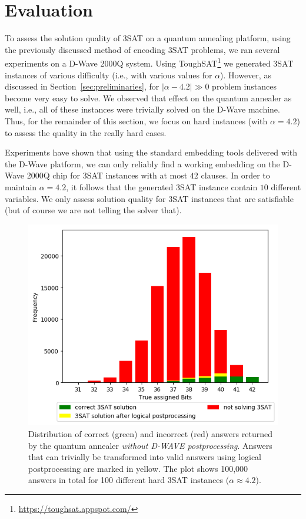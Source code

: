 
\section{Evaluation}
\label{sec:evaluation}

To assess the solution quality of 3SAT on a quantum annealing platform, using the previously discussed method of encoding 3SAT problems, we ran several experiments on a D-Wave 2000Q system. Using ToughSAT\footnote{\url{https://toughsat.appspot.com/}} we generated 3SAT instances of various difficulty (i.e., with various values for $\alpha$). However, as discussed in Section~\ref{sec:preliminaries}, for $|\alpha - 4.2| \gg 0$ problem instances become very easy to solve. We observed that effect on the quantum annealer as well, i.e., all of these instances were trivially solved on the D-Wave machine. Thus, for the remainder of this section, we focus on hard instances (with $\alpha = 4.2$) to assess the quality in the really hard cases. 

Experiments have shown that using the standard embedding tools delivered with the D-Wave platform, we can only reliably find a working embedding on the D-Wave 2000Q chip for 3SAT instances with at most $42$ clauses. In order to maintain $\alpha = 4.2$, it follows that the generated 3SAT instance contain $10$ different variables. We only assess solution quality for 3SAT instances that are satisfiable (but of course we are not telling the solver that).

\begin{figure}[t]
\centering
\includegraphics[width=.8\textwidth]{../material_2/Plots/42_4_2_def_engl_color_mit_transform.png}
\caption{Distribution of correct (green) and incorrect (red) answers returned by the quantum annealer \emph{without D-WAVE postprocessing}. Answers that can trivially be transformed into valid answers using logical postprocessing are marked in yellow. The plot shows 100,000 answers in total for 100 different hard 3SAT instances ($\alpha \approx 4.2$).}
\label{fig:distr-no-pp}
\end{figure}

